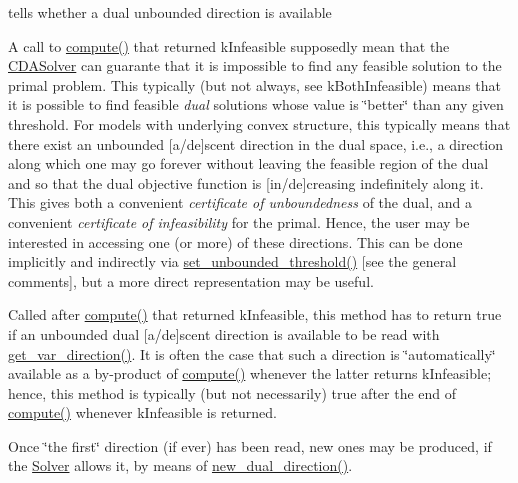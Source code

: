 tells whether a dual unbounded direction is available 

A call to \mbox{\hyperlink{class_s_m_spp__di__unipi__it_1_1_m_c_f_solver_afc8ff54ab05d22f4cca0fb0bfbeb7a49}{compute()}} that returned k\+Infeasible supposedly mean that the \mbox{\hyperlink{class_s_m_spp__di__unipi__it_1_1_c_d_a_solver}{C\+D\+A\+Solver}} can guarante that it is impossible to find any feasible solution to the primal problem. This typically (but not always, see k\+Both\+Infeasible) means that it is possible to find feasible {\itshape dual} solutions whose value is \char`\"{}better\char`\"{} than any given threshold. For models with underlying convex structure, this typically means that there exist an unbounded \mbox{[}a/de\mbox{]}scent direction in the dual space, i.\+e., a direction along which one may go forever without leaving the feasible region of the dual and so that the dual objective function is \mbox{[}in/de\mbox{]}creasing indefinitely along it. This gives both a convenient {\itshape certificate of unboundedness} of the dual, and a convenient {\itshape certificate of infeasibility} for the primal. Hence, the user may be interested in accessing one (or more) of these directions. This can be done implicitly and indirectly via \mbox{\hyperlink{class_s_m_spp__di__unipi__it_1_1_solver_ae1717d1363782e086aa797e7437c0352}{set\+\_\+unbounded\+\_\+threshold()}} \mbox{[}see the general comments\mbox{]}, but a more direct representation may be useful.

Called after \mbox{\hyperlink{class_s_m_spp__di__unipi__it_1_1_m_c_f_solver_afc8ff54ab05d22f4cca0fb0bfbeb7a49}{compute()}} that returned k\+Infeasible, this method has to return true if an unbounded dual \mbox{[}a/de\mbox{]}scent direction is available to be read with \mbox{\hyperlink{class_s_m_spp__di__unipi__it_1_1_m_c_f_solver_af6cbccb8671398cc84c4e0a730a03285}{get\+\_\+var\+\_\+direction()}}. It is often the case that such a direction is \char`\"{}automatically\char`\"{} available as a by-\/product of \mbox{\hyperlink{class_s_m_spp__di__unipi__it_1_1_m_c_f_solver_afc8ff54ab05d22f4cca0fb0bfbeb7a49}{compute()}} whenever the latter returns k\+Infeasible; hence, this method is typically (but not necessarily) true after the end of \mbox{\hyperlink{class_s_m_spp__di__unipi__it_1_1_m_c_f_solver_afc8ff54ab05d22f4cca0fb0bfbeb7a49}{compute()}} whenever k\+Infeasible is returned.

Once \char`\"{}the first\char`\"{} direction (if ever) has been read, new ones may be produced, if the \mbox{\hyperlink{class_s_m_spp__di__unipi__it_1_1_solver}{Solver}} allows it, by means of \mbox{\hyperlink{class_s_m_spp__di__unipi__it_1_1_c_d_a_solver_ad83925e362d49bbe570a881791e45ea0}{new\+\_\+dual\+\_\+direction()}}.


